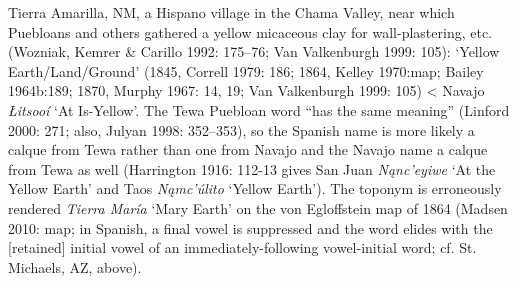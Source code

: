 Tierra Amarilla, NM, a Hispano village in the Chama Valley, near which Puebloans and others gathered a yellow micaceous clay for wall-plastering, etc. (Wozniak, Kemrer \& Carillo 1992: 175–76; Van Valkenburgh 1999: 105): \textit{ }‘Yellow Earth/Land/Ground’ (1845, Correll 1979: 186; 1864, Kelley 1970:map; Bailey 1964b:189; 1870, Murphy 1967: 14, 19; Van Valkenburgh 1999: 105) {\textless} Navajo \textit{Łitsooí}  ‘At Is-Yellow’.  The Tewa Puebloan word “has the same meaning” (Linford 2000: 271; also, Julyan 1998: 352–353), so the Spanish name is more likely a calque from Tewa rather than one from Navajo and the Navajo name a calque from Tewa as well (Harrington 1916: 112-13 gives San Juan \textit{Nąnc’eyiwe }‘At the Yellow Earth’ and Taos \textit{Nąmc’úlito} ‘Yellow Earth’).  The toponym is erroneously rendered \textit{Tierra María} ‘Mary Earth’ on the von Egloffstein map of 1864 (Madsen 2010: map; in Spanish, a final vowel is suppressed and the word elides with the [retained] initial vowel of an immediately-following vowel-initial word; cf. St. Michaels, AZ, above).

